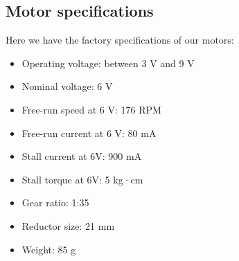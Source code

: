 \subsection{Motor specifications}
Here we have the factory specifications of our motors: 
\begin{itemize}
    \item Operating voltage: between 3 V and 9 V
    \item Nominal voltage: 6 V
    \item Free-run speed at 6 V: 176 RPM
    \item Free-run current at 6 V: 80 mA
    \item Stall current at 6V: 900 mA
    \item Stall torque at 6V: 5 kg·cm
    \item Gear ratio: 1:35
    \item Reductor size: 21 mm
    \item Weight: 85 g
\end{itemize}
